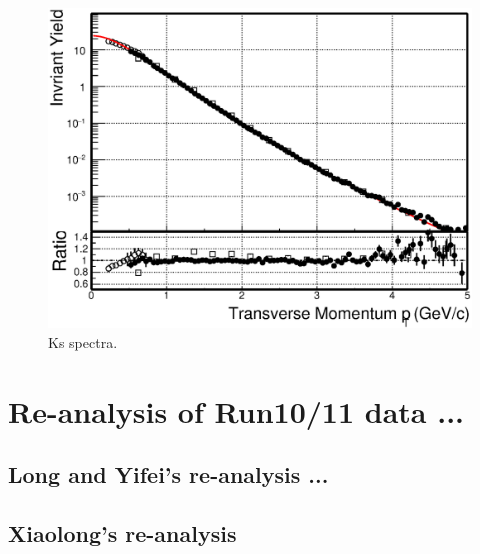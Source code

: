 \documentclass[a4paper]{article}
\begin{document}
\begin{figure}
\centering
\includegraphics[width=0.7\columnwidth]{figure/Run14_D0HFT/Ks_spectra_PtCut_0.eps}
\caption{Ks spectra.}
\label{Ks_spectra}
\end{figure}



\section{\label{Run1011}Re-analysis of Run10/11 data ... }

\subsection{Long and Yifei's re-analysis ... }



\subsection{Xiaolong's re-analysis}




\clearpage


% 
\end{document}

